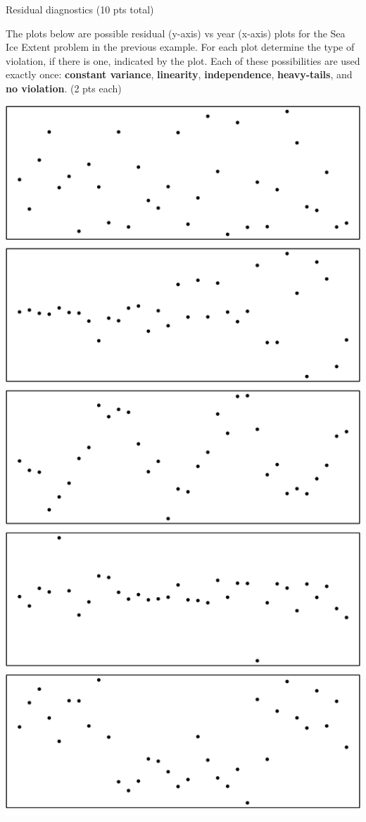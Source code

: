 \documentclass[10pt,draft]{article}
\begin{document}
\newpage
\noindent \begin{Large}Residual diagnostics  (10 pts total) \end{Large}

\bigskip 

\noindent The plots below are possible residual (y-axis) vs year (x-axis) plots for the Sea Ice Extent problem in the previous example. For each plot determine the type of violation, if there is one, indicated by the plot. Each of these possibilities are used exactly once: {\bf constant variance}, {\bf linearity}, {\bf independence}, {\bf heavy-tails}, and {\bf no violation}. (2 pts each)

\vspace{0.2in}

\begin{minipage}{0.6\linewidth}
    \includegraphics[width=\textwidth]{plots}
\end{minipage}
\end{document}
